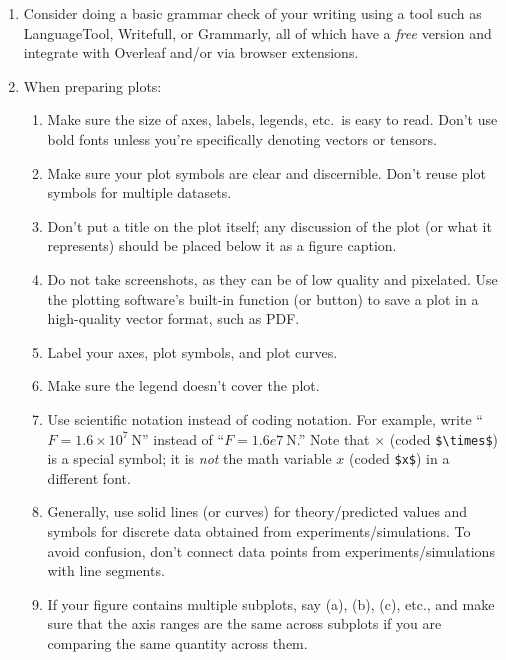\documentclass[11pt]{article}
\begin{document}
\begin{enumerate}
	\item Consider doing a basic grammar check of your writing using a tool such as LanguageTool, Writefull, or Grammarly, all of which have a \emph{free} version and integrate with Overleaf and/or via browser extensions.

	\item When preparing plots:

	\begin{enumerate}
		\item Make sure the size of axes, labels, legends, etc.\ is easy to read. Don't use bold fonts unless you're specifically denoting vectors or tensors.

		\item Make sure your plot symbols are clear and discernible. Don't reuse plot symbols for multiple datasets.

		\item Don't put a title on the plot itself; any discussion of the plot (or what it represents) should be placed below it as a figure caption.

		\item Do not take screenshots, as they can be of low quality and pixelated.  Use the plotting software's built-in function (or button) to save a plot in a high-quality vector format, such as PDF.

		\item Label your axes, plot symbols, and plot curves.

		\item Make sure the legend doesn't cover the plot.

		\item Use scientific notation instead of coding notation. For example, write ``$F=1.6\times10^{7}~\si{\newton}$'' instead of ``$F = 1.6e7~\si{\newton}$.'' Note that $\times$ (coded \verb+$\times$+) is a special symbol; it is \emph{not} the math variable $x$ (coded \verb+$x$+) in a different font.

		\item Generally, use solid lines (or curves) for theory/predicted values and symbols for discrete data obtained from experiments/simulations. To avoid confusion, don't connect data points from experiments/simulations with line segments.

		\item If your figure contains multiple subplots, say (a), (b), (c), etc., and make sure that the axis ranges are the same across subplots if you are comparing the same quantity across them.
	\end{enumerate}


\end{enumerate}
\end{document}
